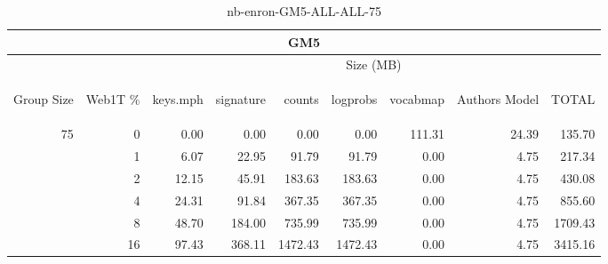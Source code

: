 \begin{center}
\begin{table}[htbp] 
 \begin{center}
\begin{tabular}{ | r | r | r | r | r | r | r | r | r |}
\hline
\multicolumn{9}{|c|}{GM5}\\
\hline
 & & \multicolumn{7}{|c|}{Size (MB)}\\ \cline{3-9}
\begin{sideways}Group Size\end{sideways} & \begin{sideways}Web1T \% \end{sideways} & \begin{sideways}keys.mph\end{sideways} & \begin{sideways}signature\end{sideways} & \begin{sideways}counts\end{sideways} & \begin{sideways}logprobs\end{sideways} & \begin{sideways}vocabmap\end{sideways} & \begin{sideways}Authors Model \end{sideways} & \begin{sideways}TOTAL\end{sideways}\\
\hline
\multirow{5}{*}{75}
 & 0 & 0.00 & 0.00 & 0.00 & 0.00 & 111.31 & 24.39 & 135.70\\ \cline{2-9}
 & 1 & 6.07 & 22.95 & 91.79 & 91.79 & 0.00 & 4.75 & 217.34\\ \cline{2-9}
 & 2 & 12.15 & 45.91 & 183.63 & 183.63 & 0.00 & 4.75 & 430.08\\ \cline{2-9}
 & 4 & 24.31 & 91.84 & 367.35 & 367.35 & 0.00 & 4.75 & 855.60\\ \cline{2-9}
 & 8 & 48.70 & 184.00 & 735.99 & 735.99 & 0.00 & 4.75 & 1709.43\\ \cline{2-9}
 & 16 & 97.43 & 368.11 & 1472.43 & 1472.43 & 0.00 & 4.75 & 3415.16\\ \cline{2-9}
\hline
\end{tabular}
\caption{nb-enron-GM5-ALL-ALL-75}
\label{table:nb-enron-GM5-ALL-ALL-75}
\end{center}
 \end{table}
\end{center}

